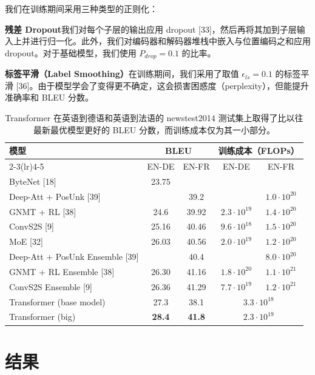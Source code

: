 \documentclass[11pt,UTF8,fontset=fandol]{ctexart}
\begin{document}
我们在训练期间采用三种类型的正则化：

\noindent\textbf{残差 Dropout}\quad 我们对每个子层的输出应用 dropout [33]，然后再将其加到子层输入上并进行归一化。此外，我们对编码器和解码器堆栈中嵌入与位置编码之和应用 dropout。对于基础模型，我们使用 $P_{drop} = 0.1$ 的比率。

\noindent\textbf{标签平滑（Label Smoothing）}\quad 在训练期间，我们采用了取值 $\epsilon_{ls} = 0.1$ 的标签平滑 [36]。由于模型学会了变得更不确定，这会损害困惑度（perplexity），但能提升准确率和 BLEU 分数。

\begin{table}[H]\centering
\caption{Transformer 在英语到德语和英语到法语的 newstest2014 测试集上取得了比以往最新最优模型更好的 BLEU 分数，而训练成本仅为其一小部分。}
\label{tab:2}
\begin{tabular}{lcccc}
\toprule
\multirow{2}{*}{模型} & \multicolumn{2}{c}{BLEU} & \multicolumn{2}{c}{训练成本（FLOPs）} \\
\cmidrule(lr){2-3}\cmidrule(lr){4-5}
 & EN-DE & EN-FR & EN-DE & EN-FR \\
\midrule
ByteNet [18] & 23.75 & & & \\
Deep-Att + PosUnk [39] & & 39.2 & & $1.0 \cdot 10^{20}$ \\
GNMT + RL [38] & 24.6 & 39.92 & $2.3 \cdot 10^{19}$ & $1.4 \cdot 10^{20}$ \\
ConvS2S [9] & 25.16 & 40.46 & $9.6 \cdot 10^{18}$ & $1.5 \cdot 10^{20}$ \\
MoE [32] & 26.03 & 40.56 & $2.0 \cdot 10^{19}$ & $1.2 \cdot 10^{20}$ \\
Deep-Att + PosUnk Ensemble [39] & & 40.4 & & $8.0 \cdot 10^{20}$ \\
GNMT + RL Ensemble [38] & 26.30 & 41.16 & $1.8 \cdot 10^{20}$ & $1.1 \cdot 10^{21}$ \\
ConvS2S Ensemble [9] & 26.36 & 41.29 & $7.7 \cdot 10^{19}$ & $1.2 \cdot 10^{21}$ \\
\midrule
Transformer (base model) & 27.3 & 38.1 & \multicolumn{2}{c}{$3.3 \cdot 10^{18}$} \\
Transformer (big) & \textbf{28.4} & \textbf{41.8} & \multicolumn{2}{c}{$2.3 \cdot 10^{19}$} \\
\bottomrule
\end{tabular}
\end{table}

\section{结果}
\end{document}
